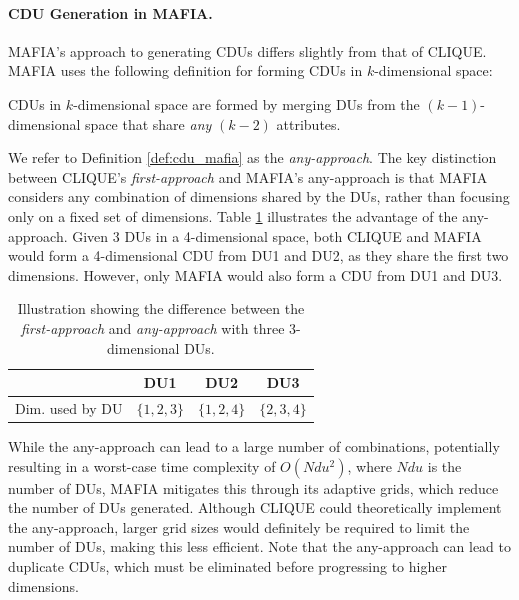 \paragraph{CDU Generation in MAFIA.}
MAFIA's approach to generating CDUs differs slightly from that of CLIQUE. MAFIA uses the following definition for forming CDUs in $k$-dimensional space:
\begin{definition}\label{def:cdu_mafia}
    CDUs in $k$-dimensional space are formed by merging DUs from the $(k-1)$-dimensional space that share \textit{any} $(k-2)$ attributes.
\end{definition}
We refer to Definition \ref{def:cdu_mafia} as the \textit{any-approach}. The key distinction between CLIQUE's \textit{first-approach} and MAFIA's any-approach is that MAFIA considers any combination of dimensions shared by the DUs, rather than focusing only on a fixed set of dimensions. Table \ref{tab:cdu} illustrates the advantage of the any-approach. Given 3 DUs in a 4-dimensional space, both CLIQUE and MAFIA would form a 4-dimensional CDU from DU1 and DU2, as they share the first two dimensions. However, only MAFIA would also form a CDU from DU1 and DU3.
\begin{table}[H]
    \vspace*{-0.4cm}
    \centering
    \begin{tabular}{l|c|c|c|}
                        & DU1           & DU2           & DU3           \\ \hline
        Dim. used by DU & $\{1, 2, 3\}$ & $\{1, 2, 4\}$ & $\{2, 3, 4\}$ \\
    \end{tabular}
    \vspace*{0.2cm}
    \caption{Illustration showing the difference between the \textit{first-approach} and \textit{any-approach} with three 3-dimensional DUs.}
    \label{tab:cdu}
    \vspace*{-0.7cm}
\end{table}

While the any-approach can lead to a large number of combinations, potentially resulting in a worst-case time complexity of $O(Ndu^2)$, where $Ndu$ is the number of DUs, MAFIA mitigates this through its adaptive grids, which reduce the number of DUs generated. Although CLIQUE could theoretically implement the any-approach, larger grid sizes would definitely be required to limit the number of DUs, making this less efficient. Note that the any-approach can lead to duplicate CDUs, which must be eliminated before progressing to higher dimensions.

